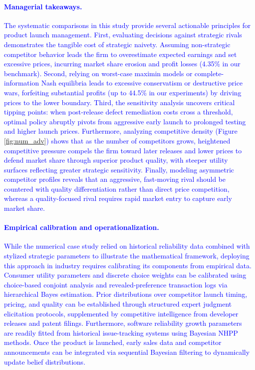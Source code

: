 \documentclass[a4paper,fleqn, 11pt]{cas-sc}
\begin{document}
\paragraph{\textcolor{blue}{Managerial takeaways.}}
\textcolor{blue}{The systematic comparisons in this study provide several actionable principles for product launch management. First, evaluating decisions against strategic rivals demonstrates the tangible cost of strategic naivety. Assuming non-strategic competitor behavior leads the firm to overestimate expected earnings and set excessive prices, incurring market share erosion and profit losses (4.35\% in our benchmark). Second, relying on worst-case maximin models or complete-information Nash equilibria leads to excessive conservatism or destructive price wars, forfeiting substantial profits (up to 44.5\% in our experiments) by driving prices to the lower boundary. Third, the sensitivity analysis uncovers critical tipping points: when post-release defect remediation costs cross a threshold, optimal policy abruptly pivots from aggressive early launch to prolonged testing and higher launch prices. Furthermore, analyzing competitive density (Figure \ref{fig:num_adv}) shows that as the number of competitors grows, heightened competitive pressure compels the firm toward later releases and lower prices to defend market share through superior product quality, with steeper utility surfaces reflecting greater strategic sensitivity. Finally, modeling asymmetric competitor profiles reveals that an aggressive, fast-moving rival should be countered with quality differentiation rather than direct price competition, whereas a quality-focused rival requires rapid market entry to capture early market share.}

\paragraph{\textcolor{blue}{Empirical calibration and operationalization.}}
\textcolor{blue}{While the numerical case study relied on historical reliability data \citep{Okumoto1979} combined with stylized strategic parameters to illustrate the mathematical framework, deploying this approach in industry requires calibrating its components from empirical data. Consumer utility parameters and discrete choice weights can be calibrated using choice-based conjoint analysis and revealed-preference transaction logs via hierarchical Bayes estimation. Prior distributions over competitor launch timing, pricing, and quality can be established through structured expert judgment elicitation protocols, supplemented by competitive intelligence from developer releases and patent filings. Furthermore, software reliability growth parameters are readily fitted from historical issue-tracking systems using Bayesian NHPP methods. Once the product is launched, early sales data and competitor announcements can be integrated via sequential Bayesian filtering to dynamically update belief distributions.}
\end{document}
